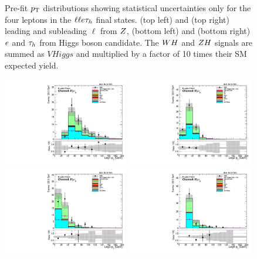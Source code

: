 \begin{figure}[htbp]
     \caption{
Pre-fit $p_\mathrm{T}$ distributions showing statistical uncertainties only for the 
four leptons in the $\ell\ell e\tau_{h}$ final states.
(top left) and (top right) leading and subleading $\ell$ from $Z$,
(bottom left) and (bottom right) $e$ and $\tau_{h}$ from Higgs boson candidate.
The $WH$ and $ZH$ signals are summed as $VHiggs$ and multiplied by a factor of
10 times their SM expected yield.
     }
     \label{fig:llet_pts}
\end{figure}

\begin{figure}[htbp]
\centering
     \includegraphics[width=0.49\textwidth]{higgs_to_taus_vh/plots/zh/fr_OS_control/LLMT/pt_1.pdf}
     \includegraphics[width=0.49\textwidth]{higgs_to_taus_vh/plots/zh/fr_OS_control/LLMT/pt_2.pdf}
     \includegraphics[width=0.49\textwidth]{higgs_to_taus_vh/plots/zh/fr_OS_control/LLMT/pt_3.pdf}
     \includegraphics[width=0.49\textwidth]{higgs_to_taus_vh/plots/zh/fr_OS_control/LLMT/pt_4.pdf}

\end{figure}
